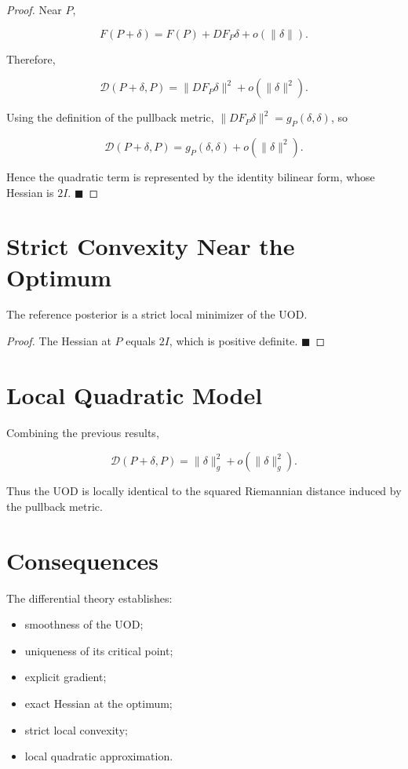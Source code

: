 \begin{proof}
Near \(P\),

\[
F(P+\delta) = F(P)+DF_P\delta+o(\|\delta\|).
\]

Therefore,

\[
\mathcal D(P+\delta,P) = \|DF_P\delta\|^{2}+o(\|\delta\|^{2}).
\]

Using the definition of the pullback metric,
\(\|DF_P\delta\|^{2}=g_P(\delta,\delta)\), so

\[
\mathcal D(P+\delta,P) = g_P(\delta,\delta)+o(\|\delta\|^{2}).
\]

Hence the quadratic term is represented by the identity bilinear form,
whose Hessian is \(2I\). $\blacksquare$
\end{proof}

\section{Strict Convexity Near the Optimum}

\begin{corollary}
\label{ch:cor:22-5}
The reference posterior is a strict local minimizer of the UOD.
\end{corollary}

\begin{proof}
The Hessian at \(P\) equals \(2I\), which is positive definite.
$\blacksquare$
\end{proof}

\section{Local Quadratic Model}

Combining the previous results,

\[
\boxed{
\mathcal D(P+\delta,P)
=
\|\delta\|_g^2
+
o(\|\delta\|_g^2).
}
\]

Thus the UOD is locally identical to the squared Riemannian distance
induced by the pullback metric.

\section{Consequences}

The differential theory establishes:
\begin{itemize}
\item smoothness of the UOD;
\item uniqueness of its critical point;
\item explicit gradient;
\item exact Hessian at the optimum;
\item strict local convexity;
\item local quadratic approximation.
\end{itemize}

